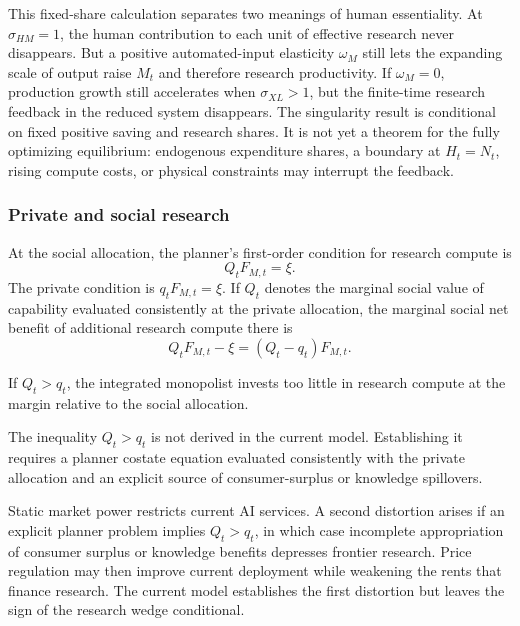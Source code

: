 This fixed-share calculation separates two meanings of human essentiality. At $\sigma_{HM}=1$, the
human contribution to each unit of effective research never disappears. But a
positive automated-input elasticity $\omega_M$ still lets the expanding scale of output
raise $M_t$ and therefore research productivity. If $\omega_M=0$, production growth still
accelerates when $\sigma_{XL}>1$, but the finite-time research feedback in the reduced
system disappears. The singularity result is conditional on fixed positive saving
and research shares. It is not yet a theorem for the fully optimizing equilibrium:
endogenous expenditure shares, a boundary at $H_t=N_t$, rising compute costs, or
physical constraints may interrupt the feedback.

\subsubsection{Private and social research}

At the social allocation, the planner's first-order condition for research compute is
\begin{equation}
    Q_tF_{M,t}=\xi.
    \label{eq:social-compute-foc}
\end{equation}
The private condition is $q_tF_{M,t}=\xi$. If $Q_t$ denotes the marginal social
value of capability evaluated consistently at the private allocation, the marginal
social net benefit of additional research compute there is
\begin{equation}
    Q_tF_{M,t}-\xi=(Q_t-q_t)F_{M,t}.
    \label{eq:knowledge-wedge}
\end{equation}

\begin{conditionalresult}
\label{cond:knowledge-wedge}
If $Q_t>q_t$, the integrated monopolist invests too little in research compute at the
margin relative to the social allocation.
\end{conditionalresult}

The inequality $Q_t>q_t$ is not derived in the current model. Establishing it
requires a planner costate equation evaluated consistently with the private
allocation and an explicit source of consumer-surplus or knowledge spillovers.

Static market power restricts current AI services. A second distortion arises if an
explicit planner problem implies $Q_t>q_t$, in which case incomplete appropriation
of consumer surplus or knowledge benefits depresses frontier research. Price
regulation may then improve current deployment while weakening the rents that
finance research. The current model establishes the first distortion but leaves the
sign of the research wedge conditional.
